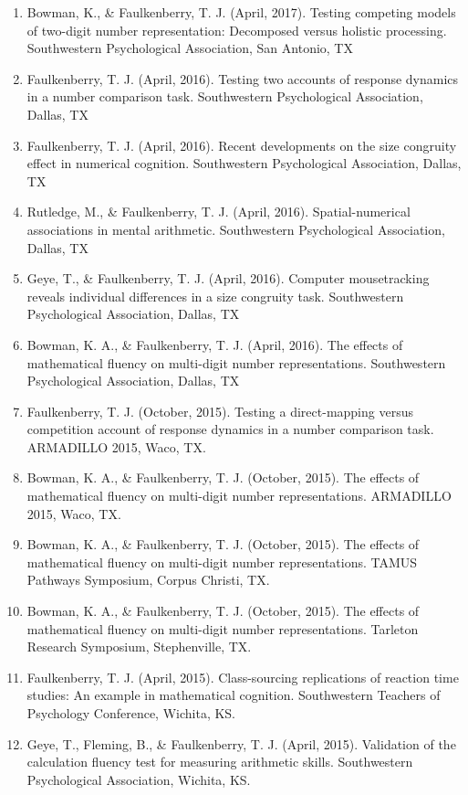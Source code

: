 \documentclass[article,10pt]{article}
\begin{document}
\begin{enumerate}
\item Bowman, K., \& Faulkenberry, T. J. (April, 2017). Testing competing models of two-digit number representation: Decomposed versus holistic processing. Southwestern Psychological Association, San Antonio, TX
\item Faulkenberry, T. J. (April, 2016). Testing two accounts of response dynamics in a number comparison task. Southwestern Psychological Association, Dallas, TX
\item Faulkenberry, T. J. (April, 2016). Recent developments on the size congruity effect in numerical cognition. Southwestern Psychological Association, Dallas, TX
\item Rutledge, M., \& Faulkenberry, T. J. (April, 2016). Spatial-numerical associations in mental arithmetic. Southwestern Psychological Association, Dallas, TX
\item Geye, T., \& Faulkenberry, T. J. (April, 2016). Computer mousetracking reveals individual differences in a size congruity task. Southwestern Psychological Association, Dallas, TX
\item Bowman, K. A., \& Faulkenberry, T. J. (April, 2016). The effects of mathematical fluency on multi-digit number representations. Southwestern Psychological Association, Dallas, TX
\item Faulkenberry, T. J. (October, 2015). Testing a direct-mapping versus competition account of response dynamics in a number comparison task. ARMADILLO 2015, Waco, TX.
\item Bowman, K. A., \& Faulkenberry, T. J. (October, 2015). The effects of mathematical fluency on multi-digit number representations. ARMADILLO 2015, Waco, TX.
\item Bowman, K. A., \& Faulkenberry, T. J. (October, 2015). The effects of mathematical fluency on multi-digit number representations. TAMUS Pathways Symposium, Corpus Christi, TX.
\item Bowman, K. A., \& Faulkenberry, T. J. (October, 2015). The effects of mathematical fluency on multi-digit number representations. Tarleton Research Symposium, Stephenville, TX.
\item Faulkenberry, T. J. (April, 2015). Class-sourcing replications of reaction time studies: An example in mathematical cognition. Southwestern Teachers of Psychology Conference, Wichita, KS.
\item Geye, T., Fleming, B., \& Faulkenberry, T. J. (April, 2015). Validation of the calculation fluency test for measuring arithmetic skills. Southwestern Psychological Association, Wichita, KS.

\end{enumerate}
\end{document}
